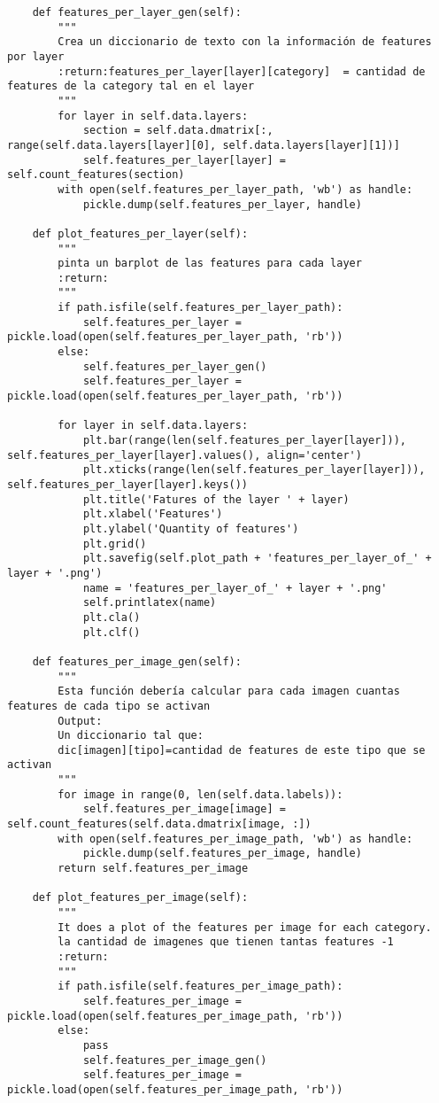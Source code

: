 \documentclass[12,twoside]{TFG-GM}
\theoremstyle{definition}
\theoremstyle{remark}
\begin{document}
\begin{verbatim}
    def features_per_layer_gen(self):
        """
        Crea un diccionario de texto con la información de features por layer
        :return:features_per_layer[layer][category]  = cantidad de features de la category tal en el layer
        """
        for layer in self.data.layers:
            section = self.data.dmatrix[:, range(self.data.layers[layer][0], self.data.layers[layer][1])]
            self.features_per_layer[layer] = self.count_features(section)
        with open(self.features_per_layer_path, 'wb') as handle:
            pickle.dump(self.features_per_layer, handle)

    def plot_features_per_layer(self):
        """
        pinta un barplot de las features para cada layer
        :return:
        """
        if path.isfile(self.features_per_layer_path):
            self.features_per_layer = pickle.load(open(self.features_per_layer_path, 'rb'))
        else:
            self.features_per_layer_gen()
            self.features_per_layer = pickle.load(open(self.features_per_layer_path, 'rb'))

        for layer in self.data.layers:
            plt.bar(range(len(self.features_per_layer[layer])), self.features_per_layer[layer].values(), align='center')
            plt.xticks(range(len(self.features_per_layer[layer])), self.features_per_layer[layer].keys())
            plt.title('Fatures of the layer ' + layer)
            plt.xlabel('Features')
            plt.ylabel('Quantity of features')
            plt.grid()
            plt.savefig(self.plot_path + 'features_per_layer_of_' + layer + '.png')
            name = 'features_per_layer_of_' + layer + '.png'
            self.printlatex(name)
            plt.cla()
            plt.clf()

    def features_per_image_gen(self):
        """
        Esta función debería calcular para cada imagen cuantas features de cada tipo se activan
        Output:
        Un diccionario tal que:
        dic[imagen][tipo]=cantidad de features de este tipo que se activan
        """
        for image in range(0, len(self.data.labels)):
            self.features_per_image[image] = self.count_features(self.data.dmatrix[image, :])
        with open(self.features_per_image_path, 'wb') as handle:
            pickle.dump(self.features_per_image, handle)
        return self.features_per_image

    def plot_features_per_image(self):
        """
        It does a plot of the features per image for each category.
        la cantidad de imagenes que tienen tantas features -1
        :return:
        """
        if path.isfile(self.features_per_image_path):
            self.features_per_image = pickle.load(open(self.features_per_image_path, 'rb'))
        else:
            pass
            self.features_per_image_gen()
            self.features_per_image = pickle.load(open(self.features_per_image_path, 'rb'))


\end{verbatim}
\end{document}
